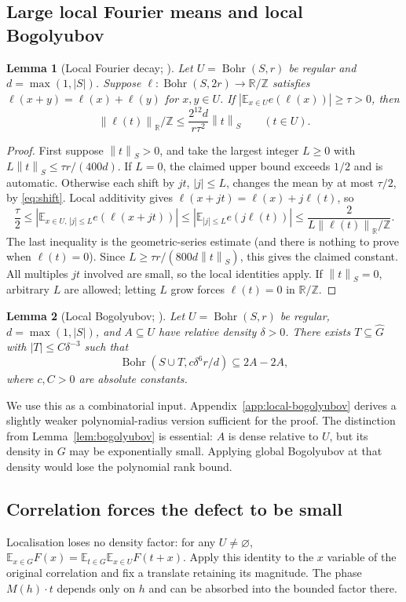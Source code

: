 \documentclass[11pt,a4paper]{article}
\newcommand{\E}{\mathbb E}
\newcommand{\T}{\mathbb R/\mathbb Z}
\newcommand{\Gh}{\widehat G}
\newcommand{\Bohr}{\operatorname{Bohr}}
\newcommand{\abs}[1]{\left|#1\right|}
\newcommand{\norm}[1]{\left\|#1\right\|}
\newcommand{\GT}[1]{\cite[#1]{GT}}
\newtheorem{lemma}{Lemma}[section]
\theoremstyle{definition}
\numberwithin{equation}{section}
\begin{document}
\subsection{Large local Fourier means and local Bogolyubov}
\begin{lemma}[Local Fourier decay; {\GT{Lemma 8.4}}]\label{lem:decay}
Let $U=\Bohr(S,r)$ be regular and $d=\max(1,|S|)$. Suppose
$\ell:\Bohr(S,2r)\to\T$ satisfies
$\ell(x+y)=\ell(x)+\ell(y)$ for $x,y\in U$.
If $|\E_{x\in U}e(\ell(x))|\geq\tau>0$, then
\[
\norm{\ell(t)}_\T\leq\frac{2^{12}d}{r\tau^2}\norm{t}_S
\qquad(t\in U).
\]
\end{lemma}
\begin{proof}
First suppose $\norm{t}_S>0$, and take the largest integer $L\geq0$
with $L\norm{t}_S\leq\tau r/(400d)$. If $L=0$, the claimed upper
bound exceeds $1/2$ and is automatic. Otherwise each shift by $jt$,
$|j|\leq L$, changes the mean by at most $\tau/2$, by
\eqref{eq:shift}. Local additivity gives
$\ell(x+jt)=\ell(x)+j\ell(t)$, so
\[
\frac\tau2\leq
\abs{\E_{x\in U,\,|j|\leq L}e(\ell(x+jt))}
\leq\abs{\E_{|j|\leq L}e(j\ell(t))}
\leq\frac{2}{L\norm{\ell(t)}_\T}.
\]
The last inequality is the geometric-series estimate (and there is
nothing to prove when $\ell(t)=0$). Since
$L\geq\tau r/(800d\norm{t}_S)$, this gives the claimed constant.
All multiples $jt$ involved are small, so the local identities apply.
If $\norm{t}_S=0$, arbitrary $L$ are allowed; letting $L$ grow forces
$\ell(t)=0$ in $\T$.
\end{proof}

\begin{lemma}[Local Bogolyubov; {\GT{Lemma 8.8}}]\label{lem:local-bogolyubov}
Let $U=\Bohr(S,r)$ be regular, $d=\max(1,|S|)$, and
$A\subseteq U$ have relative density $\delta>0$. There exists
$T\subseteq\Gh$ with $|T|\leq C\delta^{-3}$ such that
\[
\Bohr(S\cup T,c\delta^6r/d)\subseteq2A-2A,
\]
where $c,C>0$ are absolute constants.
\end{lemma}
We use this as a combinatorial input. Appendix~\ref{app:local-bogolyubov}
derives a slightly weaker polynomial-radius version sufficient for the
proof. The distinction from Lemma~\ref{lem:bogolyubov} is essential:
$A$ is dense relative to $U$, but its density in $G$ may be exponentially
small. Applying global Bogolyubov at that density would lose the
polynomial rank bound.

\subsection{Correlation forces the defect to be small}
Localisation loses no density factor: for any $U\ne\varnothing$,
$\E_{x\in G}F(x)=\E_{t\in G}\E_{x\in U}F(t+x)$.
Apply this identity to the $x$ variable of the original correlation and
fix a translate retaining its magnitude. The phase $M(h)\cdot t$
depends only on $h$ and can be absorbed into the bounded factor there.
\end{document}
